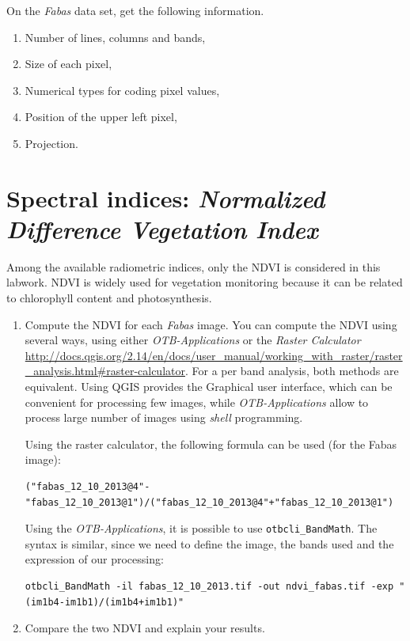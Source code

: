 \documentclass[a4paper,11pt,DIV=18]{scrartcl}
\begin{document}
\begin{work}
On the \emph{Fabas} data set, get the following information.
\begin{enumerate}
\item Number of lines, columns and bands,
\item Size of each pixel,
\item Numerical types for coding pixel values,
\item Position of the upper left pixel,
\item Projection.
\end{enumerate}
\end{work}
\section{Spectral indices: \emph{Normalized Difference Vegetation Index}}
\label{sec:orgheadline20}
Among the available  radiometric indices, only the  NDVI is considered
in this labwork. NDVI is widely used for vegetation monitoring because
it can be related to chlorophyll content and photosynthesis.

\begin{work}
\begin{enumerate}
\item Compute  the NDVI for each  \emph{Fabas} image.  You can  compute the NDVI
using several  ways, using  either \emph{OTB-Applications} or  the \emph{Raster
Calculator}
\url{http://docs.qgis.org/2.14/en/docs/user_manual/working_with_raster/raster_analysis.html#raster-calculator}.
For a per  band analysis, both methods are  equivalent.  Using QGIS
provides the Graphical user interface,  which can be convenient for
processing  few images,  while  \emph{OTB-Applications}  allow to  process
large number of images using \emph{shell} programming.

Using the raster calculator, the following formula can be used (for
the Fabas image):

\begin{verbatim}
("fabas_12_10_2013@4"-"fabas_12_10_2013@1")/("fabas_12_10_2013@4"+"fabas_12_10_2013@1")
\end{verbatim}

Using    the   \emph{OTB-Applications},    it   is    possible   to    use
\texttt{otbcli\_BandMath}. The syntax is similar, since we need to define the
image, the bands used and the expression of our processing:

\begin{verbatim}
otbcli_BandMath -il fabas_12_10_2013.tif -out ndvi_fabas.tif -exp "(im1b4-im1b1)/(im1b4+im1b1)"
\end{verbatim}

\item Compare the two NDVI and explain your results.
\end{enumerate}
\end{work}
\end{document}
